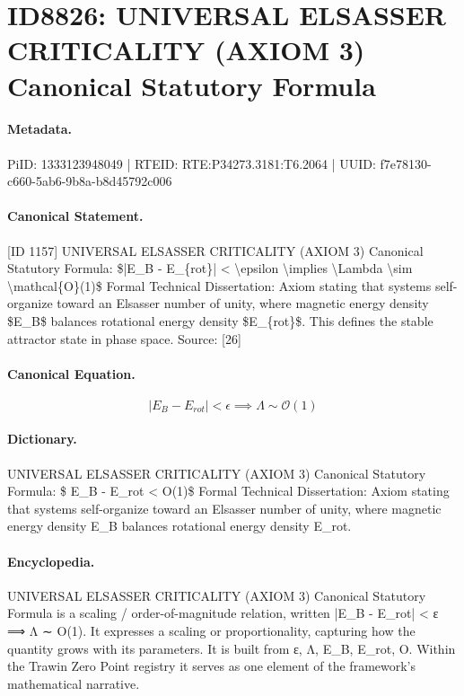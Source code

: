 \section*{ID8826: UNIVERSAL ELSASSER CRITICALITY (AXIOM 3) Canonical Statutory Formula}
\paragraph{Metadata.}
PiID: 1333123948049 | RTEID: RTE:P34273.3181:T6.2064 | UUID: f7e78130-c660-5ab6-9b8a-b8d45792c006

\paragraph{Canonical Statement.}
[ID 1157] UNIVERSAL ELSASSER CRITICALITY (AXIOM 3) Canonical Statutory Formula: \$|E\_B - E\_\{rot\}| < \textbackslash{}epsilon \textbackslash{}implies \textbackslash{}Lambda \textbackslash{}sim \textbackslash{}mathcal\{O\}(1)\$ Formal Technical Dissertation: Axiom stating that systems self-organize toward an Elsasser number of unity, where magnetic energy density \$E\_B\$ balances rotational energy density \$E\_\{rot\}\$. This defines the stable attractor state in phase space. Source: [26]

\paragraph{Canonical Equation.}
\[
|E_B - E_{rot}| < \epsilon \implies \Lambda \sim \mathcal{O}(1)
\]

\paragraph{Dictionary.}
UNIVERSAL ELSASSER CRITICALITY (AXIOM 3) Canonical Statutory Formula: \$ E\_B - E\_rot < O(1)\$ Formal Technical Dissertation: Axiom stating that systems self-organize toward an Elsasser number of unity, where magnetic energy density E\_B balances rotational energy density E\_rot.

\paragraph{Encyclopedia.}
UNIVERSAL ELSASSER CRITICALITY (AXIOM 3) Canonical Statutory Formula is a scaling / order-of-magnitude relation, written |E\_B - E\_rot| < ε ⟹ Λ ∼ O(1). It expresses a scaling or proportionality, capturing how the quantity grows with its parameters. It is built from ε, Λ, E\_B, E\_rot, O. Within the Trawin Zero Point registry it serves as one element of the framework's mathematical narrative.
